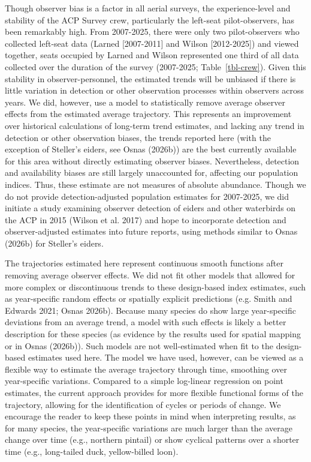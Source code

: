 \documentclass[
]{article}
\begin{document}
Though observer bias is a factor in all aerial surveys, the
experience-level and stability of the ACP Survey crew, particularly the
left-seat pilot-observers, has been remarkably high. From 2007-2025,
there were only two pilot-observers who collected left-seat data (Larned
{[}2007-2011{]} and Wilson {[}2012-2025{]}) and viewed together, seats
occupied by Larned and Wilson represented one third of all data
collected over the duration of the survey (2007-2025;
Table~\ref{tbl-crew}). Given this stability in observer-personnel, the
estimated trends will be unbiased if there is little variation in
detection or other observation processes within observers across years.
We did, however, use a model to statistically remove average observer
effects from the estimated average trajectory. This represents an
improvement over historical calculations of long-term trend estimates,
and lacking any trend in detection or other observation biases, the
trends reported here (with the exception of Steller's eiders, see Osnas
(2026b)) are the best currently available for this area without directly
estimating observer biases. Nevertheless, detection and availability
biases are still largely unaccounted for, affecting our population
indices. Thus, these estimate are not measures of absolute abundance.
Though we do not provide detection-adjusted population estimates for
2007-2025, we did initiate a study examining observer detection of
eiders and other waterbirds on the ACP in 2015 (Wilson et al. 2017) and
hope to incorporate detection and observer-adjusted estimates into
future reports, using methods similar to Osnas (2026b) for Steller's
eiders.

The trajectories estimated here represent continuous smooth functions
after removing average observer effects. We did not fit other models
that allowed for more complex or discontinuous trends to these
design-based index estimates, such as year-specific random effects or
spatially explicit predictions (e.g. Smith and Edwards 2021; Osnas
2026b). Because many species do show large year-specific deviations from
an average trend, a model with such effects is likely a better
description for these species (as evidence by the results used for
spatial mapping or in Osnas (2026b)). Such models are not well-estimated
when fit to the design-based estimates used here. The model we have
used, however, can be viewed as a flexible way to estimate the average
trajectory through time, smoothing over year-specific variations.
Compared to a simple log-linear regression on point estimates, the
current approach provides for more flexible functional forms of the
trajectory, allowing for the identification of cycles or periods of
change. We encourage the reader to keep these points in mind when
interpreting results, as for many species, the year-specific variations
are much larger than the average change over time (e.g., northern
pintail) or show cyclical patterns over a shorter time (e.g.,
long-tailed duck, yellow-billed loon).
\end{document}
